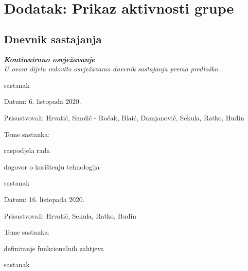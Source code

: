 \chapter*{Dodatak: Prikaz aktivnosti grupe}
		
		\section*{Dnevnik sastajanja}
		
		\textbf{\textit{Kontinuirano osvježavanje}}\\
		
		 \textit{U ovom dijelu redovito osvježavamo dnevnik sastajanja prema predlošku.}
		
		\begin{packed_enum}
			\item  sastanak
			
			\item[] \begin{packed_item}
				\item Datum: 6. listopada 2020.
				\item Prisustvovali: Hrvatić, Smolić - Ročak, Blaić, Damjanović, Sekula, Ratko, Huđin
				\item Teme sastanka:
				\begin{packed_item}
					\item  raspodjela rada
					\item  dogovor o korištenju tehnologija
				\end{packed_item}
			\end{packed_item}
			
			\item  sastanak
			
			\item[] \begin{packed_item}
				\item Datum: 16. listopada 2020.
				\item Prisustvovali: Hrvatić, Sekula, Ratko, Huđin
				\item Teme sastanka:
				\begin{packed_item}
					\item  definiranje funkcionalnih zahtjeva
				\end{packed_item}
			\end{packed_item}
			
			\item  sastanak
			

\end{packed_enum}
